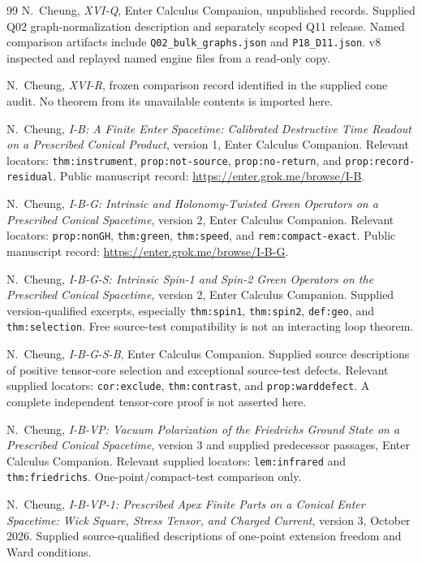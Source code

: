 \documentclass[11pt,a4paper]{article}
\newcommand{\loc}[1]{\nolinkurl{#1}}
\theoremstyle{plain}
\theoremstyle{definition}
\theoremstyle{remark}
\numberwithin{equation}{section}
\begin{document}
\begin{thebibliography}{99}
\ddag N.~Cheung,
\emph{XVI-Q},
Enter Calculus Companion, unpublished records.
Supplied Q02 graph-normalization description and separately
scoped Q11 release.
Named comparison artifacts include
\loc{Q02_bulk_graphs.json} and \loc{P18_D11.json}.
v8 inspected and replayed named engine files from a read-only copy.

\dag N.~Cheung,
\emph{XVI-R},
frozen comparison record identified in the supplied cone audit.
No theorem from its unavailable contents is imported here.

\ddag N.~Cheung,
\emph{I-B: A Finite Enter Spacetime:
Calibrated Destructive Time Readout on a Prescribed Conical Product},
version 1, Enter Calculus Companion.
Relevant locators:
\loc{thm:instrument}, \loc{prop:not-source},
\loc{prop:no-return}, and \loc{prop:record-residual}.
Public manuscript record:
\url{https://enter.grok.me/browse/I-B}.

\ddag N.~Cheung,
\emph{I-B-G: Intrinsic and Holonomy-Twisted Green Operators on a
Prescribed Conical Spacetime},
version 2, Enter Calculus Companion.
Relevant locators:
\loc{prop:nonGH}, \loc{thm:green}, \loc{thm:speed},
and \loc{rem:compact-exact}.
Public manuscript record:
\url{https://enter.grok.me/browse/I-B-G}.

\ddag N.~Cheung,
\emph{I-B-G-S: Intrinsic Spin-1 and Spin-2 Green Operators on the
Prescribed Conical Spacetime},
version 2, Enter Calculus Companion.
Supplied version-qualified excerpts, especially
\loc{thm:spin1}, \loc{thm:spin2},
\loc{def:geo}, and \loc{thm:selection}.
Free source-test compatibility is not an interacting loop theorem.

\ddag N.~Cheung,
\emph{I-B-G-S-B},
Enter Calculus Companion.
Supplied source descriptions of positive tensor-core selection
and exceptional source-test defects.
Relevant supplied locators:
\loc{cor:exclude}, \loc{thm:contrast}, and
\loc{prop:warddefect}.
A complete independent tensor-core proof is not asserted here.

\ddag N.~Cheung,
\emph{I-B-VP: Vacuum Polarization of the Friedrichs Ground State
on a Prescribed Conical Spacetime},
version 3 and supplied predecessor passages,
Enter Calculus Companion.
Relevant supplied locators:
\loc{lem:infrared} and \loc{thm:friedrichs}.
One-point/compact-test comparison only.

\ddag N.~Cheung,
\emph{I-B-VP-1: Prescribed Apex Finite Parts on a Conical Enter
Spacetime: Wick Square, Stress Tensor, and Charged Current},
version 3, October 2026.
Supplied source-qualified descriptions of one-point extension
freedom and Ward conditions.


\end{thebibliography}
\end{document}
